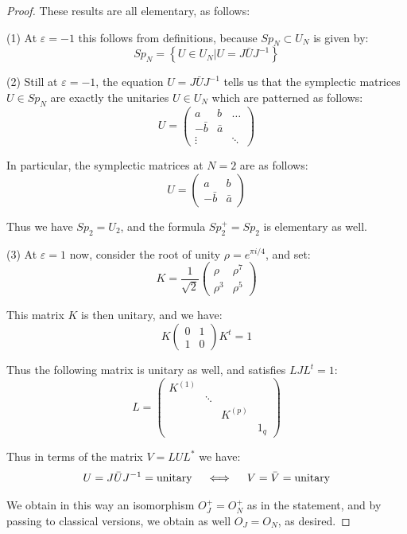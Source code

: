 \documentclass[12pt]{amsbook}
\begin{document}
\begin{proof}
These results are all elementary, as follows:

\medskip

(1) At $\varepsilon=-1$ this follows from definitions, because $Sp_N\subset U_N$ is given by:
$$Sp_N=\left\{U\in U_N\Big|U=J\bar{U}J^{-1}\right\}$$

(2) Still at $\varepsilon=-1$, the equation $U=J\bar{U}J^{-1}$ tells us that the symplectic matrices $U\in Sp_N$ are exactly the unitaries $U\in U_N$ which are patterned as follows:
$$U=\begin{pmatrix}
a&b&\ldots\\
-\bar{b}&\bar{a}\\
\vdots&&\ddots
\end{pmatrix}$$

In particular, the symplectic matrices at $N=2$ are as follows:
$$U=\begin{pmatrix}
a&b\\
-\bar{b}&\bar{a}
\end{pmatrix}$$

Thus we have $Sp_2=U_2$, and the formula $Sp_2^+=Sp_2$ is elementary as well.

\medskip

(3) At $\varepsilon=1$ now, consider the root of unity $\rho=e^{\pi i/4}$, and set:
$$K=\frac{1}{\sqrt{2}}\begin{pmatrix}\rho&\rho^7\\ \rho^3&\rho^5\end{pmatrix}$$

This matrix $K$ is then unitary, and we have:
$$K\begin{pmatrix}0&1\\1&0\end{pmatrix}K^t=1$$

Thus the following matrix is unitary as well, and satisfies $LJL^t=1$:
$$L=\begin{pmatrix}K^{(1)}\\&\ddots\\&&K^{(p)}\\&&&1_q\end{pmatrix}$$

Thus in terms of the matrix $V=LUL^*$ we have:
$$U=J\bar{U}J^{-1}={\rm unitary}
\quad\iff\quad V=\bar{V}={\rm unitary}$$

We obtain in this way an isomorphism $O_J^+=O_N^+$ as in the statement, and by passing to classical versions, we obtain as well $O_J=O_N$, as desired.
\end{proof}
\end{document}

